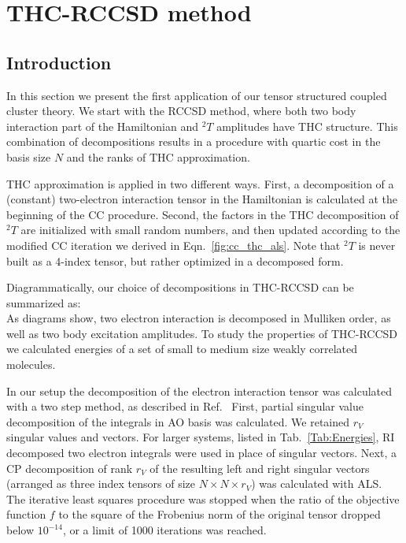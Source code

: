 \chapter{THC-RCCSD method
\label{sec:THC-RCCSD}}

\section{Introduction}
In this section we present the first application of our tensor structured 
coupled cluster theory. We start with the RCCSD method, where both two body 
interaction part of the Hamiltonian and ${}^2T$ amplitudes have THC structure. 
This combination of decompositions results in a procedure with quartic cost in 
the basis size $N$ and the ranks of THC approximation.

THC approximation is applied in two different ways. First, a decomposition 
of a (constant) two-electron interaction tensor in the Hamiltonian is 
calculated at the beginning of the CC procedure. Second, the factors in the 
THC decomposition of ${}^2T$ are initialized with small random numbers, 
and then updated according to the modified CC iteration we derived in 
Eqn.~\ref{fig:cc_thc_als}. Note that ${}^2T$ is never built as 
a 4-index tensor, but rather optimized in a decomposed form.

Diagrammatically, our choice of decompositions in THC-RCCSD can be summarized 
as:
%
\begin{equation}
\label{fig:rccsd_thc_def}
\end{equation}
%
As diagrams show, two electron interaction is decomposed in Mulliken order, as 
well as two body excitation amplitudes. To study the properties of THC-RCCSD 
we calculated energies of a set of small to medium size weakly 
correlated molecules.

In our setup the decomposition of the electron interaction tensor was 
calculated with a two step method, as described in 
Ref.~\cite{schutski2017tensor} First, partial singular value decomposition of 
the integrals in AO basis was calculated. We retained $r_{V}$ singular values 
and vectors. For larger systems, listed in Tab.~\ref{Tab:Energies}, RI 
decomposed two electron integrals were used in place of singular 
vectors. Next, a CP decomposition of rank $r_{V}$ of the resulting 
left and right singular vectors (arranged as three index tensors of size $N 
\times N \times r_{V}$) was calculated with ALS. The iterative least squares 
procedure was stopped when the ratio of the objective function $f$ to the 
square of the Frobenius norm of the original tensor dropped below $10^{-14}$, or 
a limit of 1000 iterations was reached.

